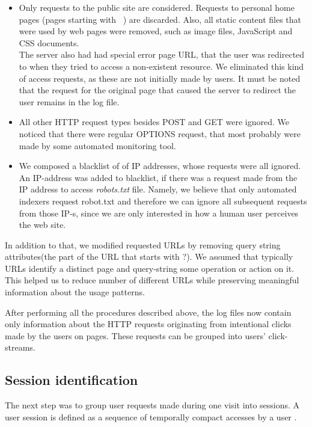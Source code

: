 \documentclass[12pt, english,a4paper]{article}
\begin{document}
\begin{itemize}
\item Only requests to the public site are considered. Requests to personal home pages (pages starting with ~) are discarded. Also, all static content files that were used by web pages were removed, such as image files, JavaScript and CSS documents. \\ The server also had had special error page URL, that the user was redirected to when they tried to access a non-existent resource. We eliminated this kind of access requests, as these are not initially made by users. It must be noted that the request for the original page that caused the server to redirect the user remains in the log file.
  
\item All other HTTP request types besides POST and GET were ignored. We noticed that there were regular OPTIONS request, that most probably were made by some automated monitoring tool. 
  
\item We composed a blacklist of of IP addresses, whose requests were all ignored. An IP-address was added to blacklist, if there was a request made from the IP address to access \emph{robots.txt} file. Namely, we believe that only automated indexers request robot.txt and therefore we can ignore all subsequent requests from those IP-s, since we are only interested in how a human user perceives the web site. 
\end{itemize}


In addition to that, we modified requested URLs by removing query string attributes(the part of the URL that starts with ?). We assumed that typically URLs identify a distinct page and query-string some operation or action on it. This helped us to reduce number of different URLs while preserving meaningful information about the usage patterns.

After performing all the procedures described above, the log files now contain only information about the HTTP requests originating from intentional clicks made by the users on pages. These requests can be grouped into users' click-streams.











\subsection{Session identification}
The next step was to group user requests made during one visit into sessions. A user session is defined as a sequence of temporally compact accesses by a user \cite{on_mining_logs}.
\end{document}
